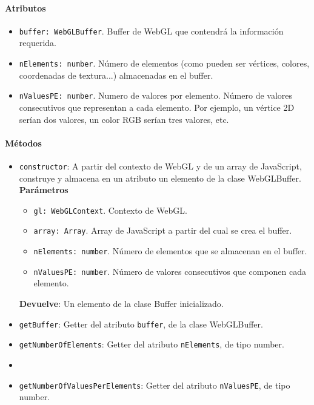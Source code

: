 \paragraph*{Atributos}
\begin{itemize}
    \item \verb|buffer: WebGLBuffer|. Buffer de WebGL que contendrá la información requerida.
    \item \verb|nElements: number|. Número de elementos (como pueden ser vértices, colores, coordenadas de textura...) almacenadas en el buffer.
    \item \verb|nValuesPE: number|. Numero de valores por elemento. Número de valores consecutivos que representan a cada elemento. Por ejemplo, un vértice 2D serían dos valores, un color RGB serían tres valores, etc.
\end{itemize}

\paragraph*{Métodos}
\begin{itemize}
    \item \verb|constructor|: A partir del contexto de WebGL y de un array de JavaScript, construye y almacena en un atributo un elemento de la clase WebGLBuffer.
    \textbf{Parámetros}
    \begin{itemize}
        \item \verb|gl: WebGLContext|. Contexto de WebGL.
        \item \verb|array: Array|. Array de JavaScript a partir del cual se crea el buffer.
        \item \verb|nElements: number|. Número de elementos que se almacenan en el buffer.
        \item \verb|nValuesPE: number|. Número de valores consecutivos que componen cada elemento.
    \end{itemize}
    \textbf{Devuelve}: Un elemento de la clase Buffer inicializado.
    
    \item \verb|getBuffer|: Getter del atributo \verb|buffer|, de la clase WebGLBuffer.
    \item \verb|getNumberOfElements|: Getter del atributo \verb|nElements|, de tipo number.
    \item \item \verb|getNumberOfValuesPerElements|: Getter del atributo \verb|nValuesPE|, de tipo number.
\end{itemize}

